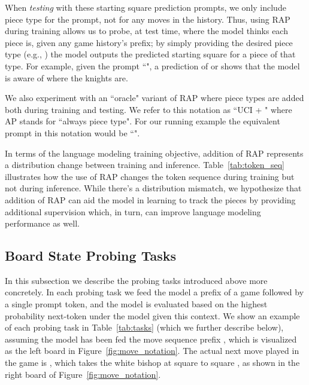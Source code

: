When \emph{testing} with these starting square prediction prompts, we only include piece type for the prompt, not for any moves in the history.
Thus, using RAP during training allows us to probe, at test time, where the model thinks each piece is, given any game history's prefix; by simply providing the desired piece type (e.g., ) the model outputs the predicted starting square for a piece of that type.
For example, given the prompt ``", a prediction of  or  shows that the model is aware of where the knights are.%

We also experiment with an ``oracle" variant of RAP where piece types are added both during training and testing. We refer to this notation as ``UCI + \piecetype" where AP stands for ``always piece type".
For our running example the equivalent prompt in this notation would be ``".

In terms of the language modeling training objective, addition of RAP represents a distribution change between training and inference.
Table~\ref{tab:token_seq} illustrates how the use of RAP changes the token sequence during training but not during inference.  
While there's a distribution mismatch, we hypothesize that addition of RAP can aid the model in learning to track the pieces by providing additional supervision which, in turn, can improve language modeling performance as well.  






\subsection{Board State Probing Tasks}
\label{sec:cloze}
In this subsection we describe the probing tasks introduced above more concretely. %
In each probing task we feed the model a prefix of a game followed by a single prompt token, and the model is evaluated based on the highest probability next-token under the model given this context. We show an example of each probing task in Table~\ref{tab:tasks} (which we further describe below), assuming the model has been fed the move sequence prefix , %
which is visualized as the left board in Figure~\ref{fig:move_notation}. The actual next move played in the game is , which takes the white bishop at square  to square , as shown in the right board of Figure~\ref{fig:move_notation}. 


